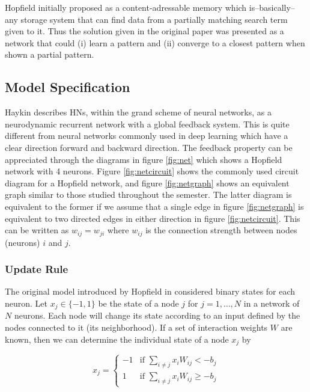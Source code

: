 \documentclass[11pt]{article}
\begin{document}
	Hopfield initially proposed as a content-adressable memory which is–basically–any storage system that can find data from a partially matching search term given to it. Thus the solution given in the original paper was presented as a network that could (i) learn a pattern and (ii) converge to a closest pattern when shown a partial pattern.

	\subsection{Model Specification} 
	Haykin \cite{haykin} describes HNs, within the grand scheme of neural networks, as a neurodynamic recurrent network with a global feedback system. This is quite different from neural networks commonly used in deep learning \cite{deeplearning2015} which have a clear direction forward and backward direction.
	The feedback property can be appreciated through the diagrams in figure \ref{fig:net} which shows a Hopfield network with 4 neurons. Figure \ref{fig:netcircuit} shows the commonly used circuit diagram for a Hopfield network, and figure \ref{fig:netgraph} shows an equivalent graph similar to those studied throughout the semester. The latter diagram is equivalent to the former if we assume that a single edge in figure \ref{fig:netgraph} is equivalent to two directed edges in either direction in figure \ref{fig:netcircuit}. This can be written as $w_{ij} = w_{ji}$ where $w_{ij}$ is the connection strength between nodes (neurons) $i$ and $j$. 


	\subsubsection{Update Rule}
	The original model introduced by Hopfield in \cite{hopfield1982neural} considered binary states for each neuron. Let $x_j \in \{ -1, 1 \}$ be the state of a node $j$ for $j=1,\ldots ,N$ in a network of $N$ neurons. Each node will change its state according to an input defined by the nodes connected to it (its neighborhood). If a set of interaction weights $W$ are known, then we can determine the individual state of a node $x_j$ by 
		
	\begin{equation} \label{eq:nodeupdate}
		x_j = \begin{cases}
			 -1  & \text{if } \sum^{}_{i \neq j} x_i W_{ij}  < -b_j \\
			1  & \text{if } \sum^{}_{i \neq j} x_i W_{ij} \ge -b_j
		\end{cases}
	\end{equation}
	
\end{document}

